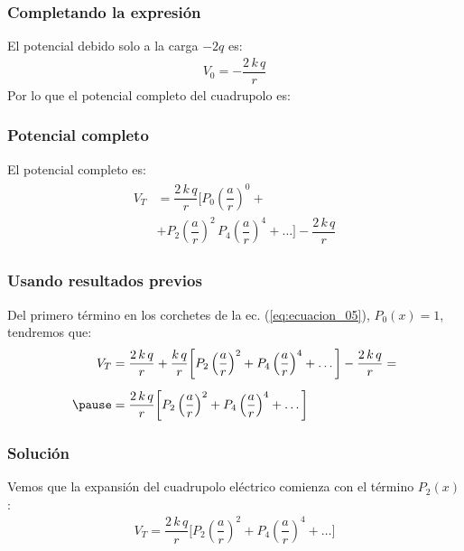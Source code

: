 \documentclass[12pt]{beamer}
\begin{document}
\begin{frame}
\frametitle{Completando la expresión}
El potencial debido solo a la carga $-2q$ es:
\pause
\begin{align*}
V_{0} = - \dfrac{2 \, k \, q}{r}
\end{align*}
\pause
Por lo que el potencial completo del cuadrupolo es:
\end{frame}
\begin{frame}
\frametitle{Potencial completo}
El potencial completo es:
\pause
\begin{align}
\begin{aligned}
V_{T} &= \dfrac{2 \, k \, q}{r} \bigg[ P_{0} \left( \dfrac{a}{r} \right)^{0} + \\[0.5em]
&+ P_{2} \left( \dfrac{a}{r} \right)^{2} \, P_{4} \left( \dfrac{a}{r} \right)^{4} + \ldots \bigg] - \dfrac{2 \, k \, q}{r}
\end{aligned}
\label{eq:ecuacion_05}
\end{align}
\end{frame}
\begin{frame}
\frametitle{Usando resultados previos}
Del primero término en los corchetes de la ec. (\ref{eq:ecuacion_05}), $P_{0}(x) = 1$, tendremos que:
\pause
\begin{eqnarray*}
\begin{aligned}
V_{T} &= \dfrac{2 \, k \, q}{r} + \dfrac{k \, q}{r} \bigg[ P_{2} \left( \dfrac{a}{r} \right)^{2} + P_{4} \left( \dfrac{a}{r} \right)^{4} + \ldots \bigg] - \dfrac{2 \, k \, q}{r} = \\[0.5em] \pause
&= \dfrac{2 \, k \, q}{r} \bigg[ P_{2} \left( \dfrac{a}{r} \right)^{2} + P_{4} \left( \dfrac{a}{r} \right)^{4} + \ldots \bigg]
\end{aligned}
\end{eqnarray*}
\end{frame}
\begin{frame}
\frametitle{Solución}
Vemos que la expansión del cuadrupolo eléctrico comienza con el término $P_{2}(x)$:
\pause
\begin{align*}
V_{T} = \dfrac{2 \, k \, q}{r} \bigg[ P_{2} \left( \dfrac{a}{r} \right)^{2} + P_{4} \left( \dfrac{a}{r} \right)^{4} + \ldots \bigg]
\end{align*}
\end{frame}

\end{document}
